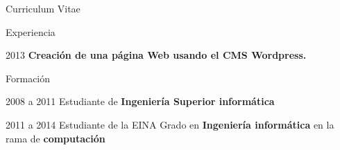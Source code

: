 \documentclass[letterpaper,12pt]{article}
\begin{document}
\begin{cv}{Curriculum Vitae}
\begin{cvlist}{Experiencia}
	\item[2013] \textbf{Creación de una página Web usando el CMS Wordpress.}

	
	


\end{cvlist}

\begin{cvlist}{Formación}

	\item[2008 a 2011] Estudiante de \textbf{Ingeniería Superior informática}\\
		
	\item[2011 a 2014] Estudiante de la EINA
		Grado en \textbf{Ingeniería informática} en la rama de \textbf{computación}\\


\end{cvlist}

\end{cv}
\end{document}
